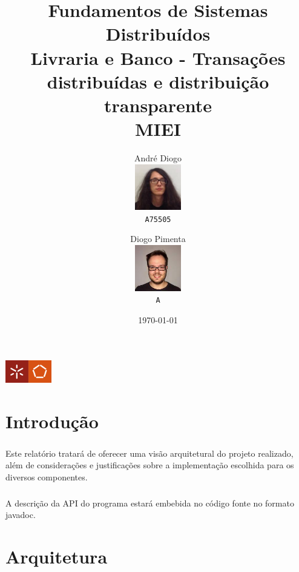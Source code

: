\documentclass[11pt,a4paper]{report}
\begin{document}
\begin{titlepage}

\title{Fundamentos de Sistemas Distribuídos\\Livraria e Banco - Transações distribuídas e distribuição transparente\\MIEI}

\includegraphics[width=2cm]{logo-ee.png}

\author{
  André Diogo\\
  \includegraphics[width=2cm]{c.jpeg}\\
  \texttt{A75505}
  \and
  Diogo Pimenta\\
  \includegraphics[width=2cm]{b.jpg}\\
  \texttt{A}
}

\date{\today}

\newpage


\end{titlepage}

\tableofcontents

\chapter{Introdução}

\paragraph{}Este relatório tratará de oferecer uma visão arquitetural do projeto realizado, além de considerações e justificações sobre a implementação escolhida para os diversos componentes.
\paragraph{}A descrição da API do programa estará embebida no código fonte no formato javadoc.

\chapter{Arquitetura}
\end{document}

